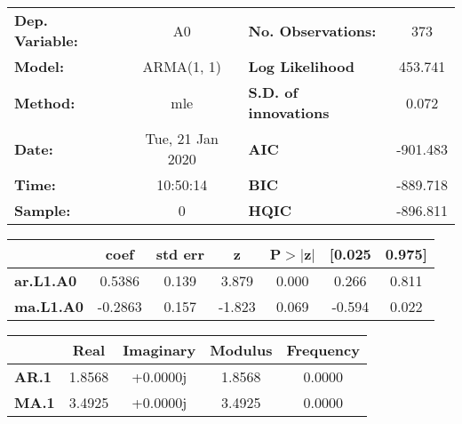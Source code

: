 \begin{center}
\begin{tabular}{lclc}
\toprule
\textbf{Dep. Variable:} &             A0            & \textbf{  No. Observations:  } &            373             \\
\textbf{Model:}         &         ARMA(1, 1)        & \textbf{  Log Likelihood     } &          453.741           \\
\textbf{Method:}        &            mle            & \textbf{  S.D. of innovations} &           0.072            \\
\textbf{Date:}          &      Tue, 21 Jan 2020     & \textbf{  AIC                } &          -901.483          \\
\textbf{Time:}          &          10:50:14         & \textbf{  BIC                } &          -889.718          \\
\textbf{Sample:}        &             0             & \textbf{  HQIC               } &          -896.811          \\
\bottomrule
\end{tabular}
\begin{tabular}{lcccccc}
                  & \textbf{coef} & \textbf{std err} & \textbf{z} & \textbf{P$>$$|$z$|$} & \textbf{[0.025} & \textbf{0.975]}  \\
\midrule
\textbf{ar.L1.A0} &       0.5386  &        0.139     &     3.879  &         0.000        &        0.266    &        0.811     \\
\textbf{ma.L1.A0} &      -0.2863  &        0.157     &    -1.823  &         0.069        &       -0.594    &        0.022     \\
\bottomrule
\end{tabular}
\begin{tabular}{lcccc}
              & \textbf{            Real} & \textbf{         Imaginary} & \textbf{         Modulus} & \textbf{        Frequency}  \\
\midrule
\textbf{AR.1} &                1.8568     &                +0.0000j     &                1.8568     &                0.0000       \\
\textbf{MA.1} &                3.4925     &                +0.0000j     &                3.4925     &                0.0000       \\
\bottomrule
\end{tabular}
\end{center}